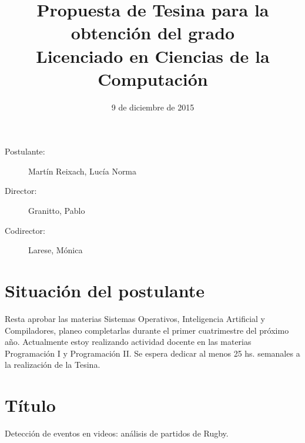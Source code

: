 \documentclass[11pt]{article}
\begin{document}
\date{9 de diciembre de 2015}
\title{Propuesta de Tesina para la obtención del grado \\ Licenciado en Ciencias de la Computación}
\maketitle

\begin{description}
  \item[Postulante:] Martín Reixach, Lucía Norma
  \item[Director:] Granitto, Pablo
  \item[Codirector:] Larese, Mónica
\end{description}

\section{Situación del postulante}
Resta aprobar las materias Sistemas Operativos, Inteligencia Artificial y Compiladores,
planeo completarlas durante el primer cuatrimestre del próximo año.
Actualmente estoy realizando actividad docente en las materias Programación I y Programación II.
Se espera dedicar al menos 25 hs. semanales a la realización de la Tesina.

\section{Título}
Detección de eventos en videos: análisis de partidos de Rugby.






\nocite{*}

\end{document}
